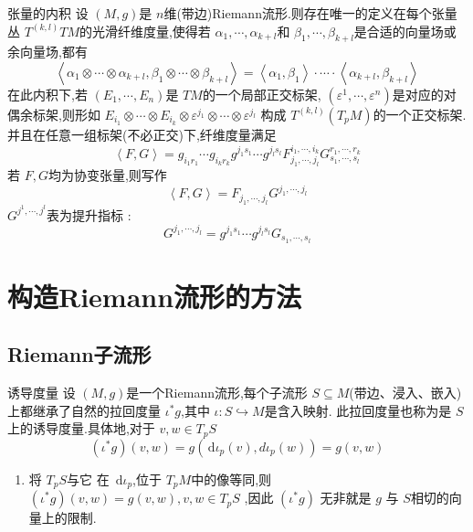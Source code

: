 \documentclass[../../几何与拓扑.tex]{subfiles}
\begin{document}
\begin{proposition}{张量的内积}
    设 \(  \left( M,g \right)   \)是 \(  n  \)维(带边)Riemann流形.则存在唯一的定义在每个张量丛 \(  T^{\left( k,l \right) }TM  \)的光滑纤维度量,使得若 \(   \alpha _1 ,\cdots , \alpha _{k+ l}  \)和 \(  \beta _1 ,\cdots ,\beta _{k+ l}  \)是合适的向量场或余向量场,都有 \[
    \left< \alpha _1 \otimes \cdots \otimes  \alpha _{k+ l},\beta _1 \otimes \cdots \otimes \beta _{k+ l} \right>= \left< \alpha _1 ,\beta _1  \right>\cdot \cdots \cdot \left< \alpha _{k+ l},\beta _{k+ l} \right>
    \]在此内积下,若 \(  \left(  E_1,\cdots,E_n  \right)   \)是 \(  TM  \)的一个局部正交标架, \(  \left(  \varepsilon^1,\cdots,\varepsilon^n \right)   \)是对应的对偶余标架,则形如 \(  E_{i_1}\otimes \cdots \otimes E_{i_{k}}\otimes  \varepsilon ^{j_1}\otimes \cdots \otimes  \varepsilon ^{j_{l}}  \)         构成 \(  T^{\left( k,l \right) }\left( T_{p}M \right)   \)的一个正交标架.并且在任意一组标架(不必正交)下,纤维度量满足 \[
    \left<F,G \right> =  g_{i_1r_1}\cdots g_{i_{k}r_{k}}g^{j_1s_1}\cdots g^{j_{l}s_{l}}F_{ j_1,\cdots,j_l }^{ i_1,\cdots,i_k }G_{ s_1,\cdots,s_l }^{ r_1,\cdots,r_k }
    \] 若 \(  F,G  \)均为协变张量,则写作 \[
    \left<F,G \right>= F_{ j_1,\cdots,j_l }G^{ j_1,\cdots,j_l }
    \]  \(  G^{ j^1,\cdots,j^l }  \)表为提升指标 : \[
    G^{ j_1,\cdots,j_l }= g^{j_1s_1}\cdots g^{j_{l}s_{l}}G_{ s_1,\cdots,s_l }
    \]  
\end{proposition}

\section{构造Riemann流形的方法}


\subsection{Riemann子流形}\label{sse-Riemann子流形}

\begin{definition}{诱导度量}
    设 $ \left( M,g \right)  $是一个Riemann流形,每个子流形 $ S\subseteq M $(带边、浸入、嵌入)上都继承了自然的拉回度量 $ \iota^{*}g $,其中 $ \iota: S \hookrightarrow M $是含入映射.
    此拉回度量也称为是 $ S $上的诱导度量.具体地,对于 $ v,w \in T_{p}S $ $$
    \left( \iota^{*}g \right)\left( v,w \right)= g\left( \,\mathrm{d} \iota_{p}\left( v \right),d \iota_{p}\left( w \right)   \right)   =g\left( v,w \right) 
    $$      
\end{definition}

\begin{remark}
    \begin{enumerate}
        \item 将 \(  T_{p}S  \)与它 在 \(  \,\mathrm{d} \iota _{p}   \),位于 \(  T_{p}M  \)中的像等同,则   \(   \left( \iota ^{*}g \right) \left( v,w \right) =  g\left( v,w \right) , v,w \in T_{p}S    \) ,因此 \(  \left( \iota ^{*}g \right)   \)
        无非就是 \(  g  \)  与 \(  S  \)相切的向量上的限制. 
    \end{enumerate}
    
\end{remark}
\end{document}
